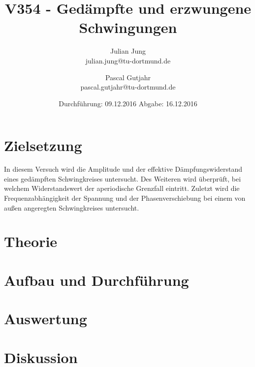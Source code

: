 

\title{V354 - Gedämpfte und erzwungene Schwingungen}
\author{Julian Jung \\ julian.jung@tu-dortmund.de
  \and Pascal Gutjahr \\ pascal.gutjahr@tu-dortmund.de}
  \date{Durchführung: 09.12.2016
  \hspace{3em}
  Abgabe: 16.12.2016}
  
\maketitle
\newpage
\tableofcontents
\newpage
\section{Zielsetzung}
In diesem Versuch wird die Amplitude und der effektive Dämpfungswiderstand eines
gedämpften Schwingkreises untersucht. Des Weiteren wird überprüft, bei
welchem Widerstandswert der aperiodische Grenzfall eintritt. Zuletzt wird die
Frequenzabhängigkeit der Spannung und der Phasenverschiebung bei einem von
außen angeregten Schwingkreises untersucht.
\section{Theorie}
 
\section{Aufbau und Durchführung}
 
\section{Auswertung}
\section{Diskussion}
\printbibliography

